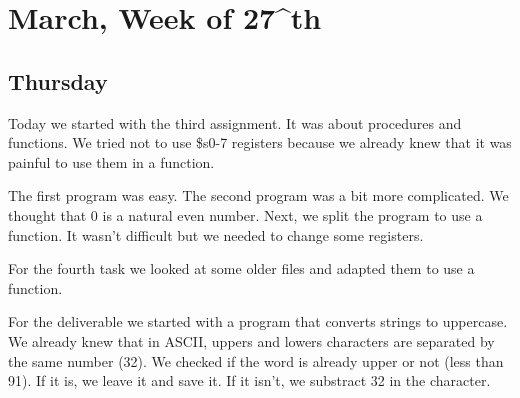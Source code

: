 \documentclass{report}
\begin{document}
\chapter{March, Week of 27^{th}}

\section{Thursday}
Today we started with the third assignment. It was about procedures and functions. We tried not to use \$s0-7 registers because we already knew that it was painful to use them in a function. 

The first program was easy. The second program was a bit more complicated. We thought that 0 is a natural even number. Next, we split the program to use a function. It wasn't difficult but we needed to change some registers.



For the fourth task we looked at some older files and adapted them to use a function.

For the deliverable we started with a program that converts strings to uppercase. We already knew that in ASCII, uppers and lowers characters are separated by the same number (32). We checked if the word is already upper or not (less than 91). If it is, we leave it and save it. If it isn't, we substract 32 in the character.
\end{document}
